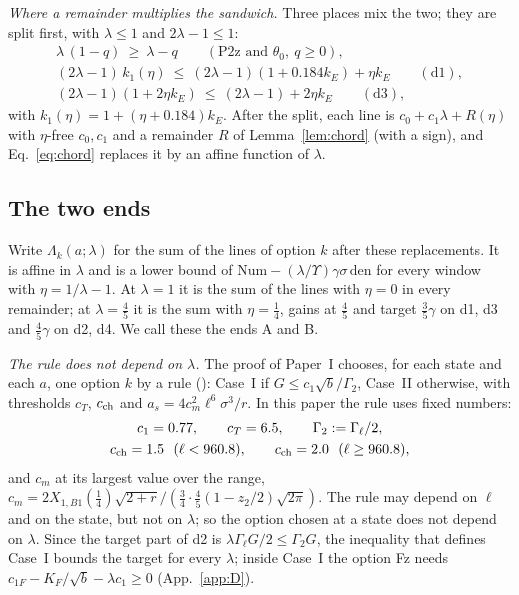\emph{Where a remainder multiplies the sandwich.}
Three places mix the two; they are split first, with $\lambda\le1$ and $2\lambda-1\le1$:
\begin{gather}
\lambda\,(1-q)\ \ge\ \lambda-q \qquad(\text{P2z and }\theta_0,\ q\ge0),\\
(2\lambda-1)\,k_1(\eta)\ \le\ (2\lambda-1)(1+0.184k_E)+\eta k_E\qquad(\text{d1}),\\
(2\lambda-1)(1+2\eta k_E)\ \le\ (2\lambda-1)+2\eta k_E\qquad(\text{d3}),
\end{gather}
with $k_1(\eta)=1+(\eta+0.184)k_E$.
After the split, each line is $c_0+c_1\lambda+R(\eta)$ with $\eta$-free $c_0,c_1$ and a remainder $R$ of Lemma~\ref{lem:chord} (with a sign), and Eq.~\eqref{eq:chord} replaces it by an affine function of $\lambda$.

\subsection{The two ends}
Write $\Lambda_k(a;\lambda)$ for the sum of the lines of option $k$ after these replacements.
It is affine in $\lambda$ and is a lower bound of $\mathrm{Num}-(\lambda/\Upsilon)\gamma\sigma\,\mathrm{den}$ for every window with $\eta=1/\lambda-1$.
At $\lambda=1$ it is the sum of the lines with $\eta=0$ in every remainder; at $\lambda=\tfrac45$ it is the sum with $\eta=\tfrac14$, gains at $\tfrac45$ and target $\tfrac35\gamma$ on d1, d3 and $\tfrac45\gamma$ on d2, d4.
We call these the ends A and B.

\emph{The rule does not depend on $\lambda$.}
The proof of Paper~I chooses, for each state and each $a$, one option $k$ by a rule (): Case~I if $G\le c_1\sqrt b/\Gamma_2$, Case~II otherwise, with thresholds $c_T$, $c_{\rm ch}$ and $a_s=4c_m^2\ell^6\sigma^3/r$.
In this paper the rule uses fixed numbers:
\begin{gather}
c_1=0.77,\qquad c_T=6.5,\qquad \Gamma_2:=\Gamma_\ell/2,\\
c_{\rm ch}=1.5\ \ (\ell<960.8),\qquad c_{\rm ch}=2.0\ \ (\ell\ge960.8),
\end{gather}
and $c_m$ at its largest value over the range, $c_m=2X_{1,B1}(\tfrac14)\sqrt{2+r}/(\tfrac34\cdot\tfrac45(1-z_2/2)\sqrt{2\pi})$.
The rule may depend on $\ell$ and on the state, but not on $\lambda$; so the option chosen at a state does not depend on $\lambda$.
Since the target part of d2 is $\lambda\Gamma_\ell G/2\le\Gamma_2G$, the inequality that defines Case~I bounds the target for every $\lambda$; inside Case~I the option Fz needs $c_{1F}-K_F/\sqrt b-\lambda c_1\ge0$ (App.~\ref{app:D}).

